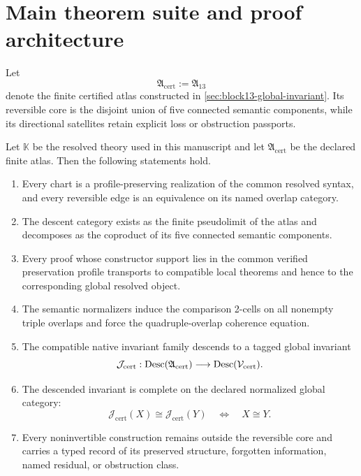 \section{Main theorem suite and proof architecture}
\label{sec:block14-main-suite}

Let
\[
 \mathfrak A_{\mathrm{cert}}:=\mathfrak A_{13}
\]
denote the finite certified atlas constructed in \cref{sec:block13-global-invariant}.  Its reversible core is the disjoint union of five connected semantic components, while its directional satellites retain explicit loss or obstruction passports.

\begin{theorem}
\label{thm:block14-main}
Let \(\mathbb K\) be the resolved theory used in this manuscript and let \(\mathfrak A_{\mathrm{cert}}\) be the declared finite atlas.  Then the following statements hold.
\begin{enumerate}
\item Every chart is a profile-preserving realization of the common resolved syntax, and every reversible edge is an equivalence on its named overlap category.
\item The descent category exists as the finite pseudolimit of the atlas and decomposes as the coproduct of its five connected semantic components.
\item Every proof whose constructor support lies in the common verified preservation profile transports to compatible local theorems and hence to the corresponding global resolved object.
\item The semantic normalizers induce the comparison 2-cells on all nonempty triple overlaps and force the quadruple-overlap coherence equation.
\item The compatible native invariant family descends to a tagged global invariant
\[
 \mathcal J_{\mathrm{cert}}:
 \operatorname{Desc}(\mathfrak A_{\mathrm{cert}})
 \longrightarrow
 \operatorname{Desc}(\mathcal V_{\mathrm{cert}}).
\]
\item The descended invariant is complete on the declared normalized global category:
\[
 \mathcal J_{\mathrm{cert}}(X)\cong
 \mathcal J_{\mathrm{cert}}(Y)
 \quad\Longleftrightarrow\quad
 X\cong Y.
\]
\item Every noninvertible construction remains outside the reversible core and carries a typed record of its preserved structure, forgotten information, named residual, or obstruction class.
\end{enumerate}
\end{theorem}

